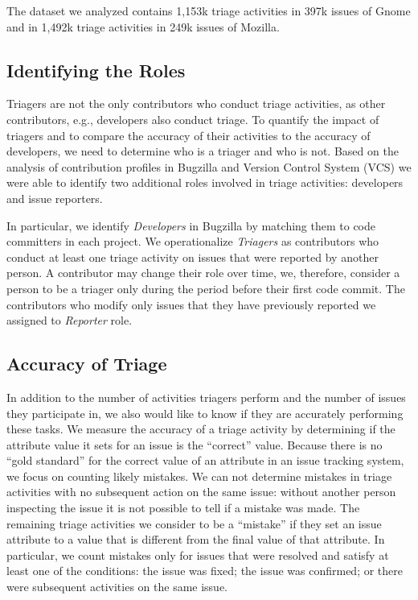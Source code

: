 \documentclass[conference]{IEEEtran}
\begin{document}
The dataset we analyzed contains 1,153k triage activities in 397k
issues of Gnome and in 1,492k triage activities in 249k issues of
Mozilla.

\subsection{Identifying the Roles}\label{ss:idroles}
Triagers are not the only contributors who conduct triage
activities, as other contributors, e.g., developers also conduct
triage. To quantify the impact of triagers and to compare the
accuracy of their activities to the accuracy of developers, we need
to determine who is a triager and who is not.  Based on the analysis
of contribution profiles in Bugzilla and Version Control System
(VCS) we were able to identify two additional roles involved in
triage activities: developers and issue reporters.


In particular, we identify {\em Developers} in Bugzilla by matching
them to code committers in each project.  We operationalize {\em
  Triagers} as contributors who conduct at least one triage activity
on issues that were reported by another person. A contributor may
change their role over time, we, therefore, consider a person to be
a triager only during the period before their first code commit.
The contributors who modify only issues that they have previously
reported we assigned to {\em Reporter} role.

\subsection{Accuracy of Triage}\label{ss:judgcor}
In addition to the number of activities triagers perform and the
number of issues they participate in, we also would like to know if
they are accurately performing these tasks. We measure the accuracy
of a triage activity by determining if the attribute value it sets
for an issue is the ``correct'' value.  Because there is no ``gold
standard'' for the correct value of an attribute in an issue
tracking system, we focus on counting likely mistakes. We can not
determine mistakes in triage activities with no subsequent action on
the same issue: without another person inspecting the issue it is
not possible to tell if a mistake was made. The remaining triage
activities we consider to be a ``mistake'' if they set an issue
attribute to a value that is different from the final value of that
attribute.  In particular, we count mistakes only for issues that
were resolved and satisfy at least one of the conditions: the issue
was fixed; the issue was confirmed; or
there were subsequent activities on the same issue.
\end{document}
